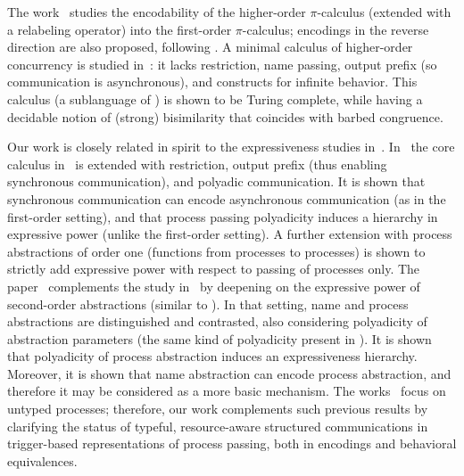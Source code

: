 The work~\cite{XuActa2012} studies the encodability of the higher-order $\pi$-calculus (extended with a relabeling operator) into the first-order $\pi$-calculus; encodings in the reverse direction are also proposed, following \cite{Tho90}.
A minimal calculus of higher-order concurrency is studied in~\cite{DBLP:journals/iandc/LanesePSS11}: it lacks restriction,  name passing, output prefix (so  communication is asynchronous), and constructs for infinite behavior. 
This calculus (a sublanguage of \HO) is shown to be Turing complete, while having a decidable notion of  
(strong) bisimilarity that coincides with barbed congruence. 

Our work is closely related in spirit to the expressiveness studies in~\cite{DBLP:conf/icalp/LanesePSS10,DBLP:conf/wsfm/XuYL13}.
In~\cite{DBLP:conf/icalp/LanesePSS10}
the core calculus in~\cite{DBLP:journals/iandc/LanesePSS11} is extended with restriction, output prefix (thus enabling synchronous communication), 
and polyadic communication. It is shown that 
synchronous communication can encode asynchronous communication (as in the first-order setting),
and that process passing polyadicity induces a hierarchy in expressive power (unlike the first-order setting).
A further extension with process abstractions of order one
(functions from processes to processes)
 is shown to strictly add expressive power with respect to passing of processes only.
The paper~\cite{DBLP:conf/wsfm/XuYL13} complements the study in~\cite{DBLP:conf/icalp/LanesePSS10} by deepening on the expressive power of second-order abstractions (similar to \HO). 
In that setting, name and process abstractions are distinguished and contrasted, also considering polyadicity of abstraction parameters (the same kind of polyadicity present in \pHOp). It is shown that polyadicity of process abstraction induces an expressiveness hierarchy. Moreover, it is shown that name abstraction can encode process abstraction, and therefore it may be considered as a more basic mechanism. 
The works~\cite{DBLP:conf/icalp/LanesePSS10,DBLP:conf/wsfm/XuYL13} focus on untyped processes;
therefore, our work complements such previous results by clarifying the status of typeful, resource-aware structured communications in
trigger-based representations of process passing, both in encodings and  behavioral equivalences.


